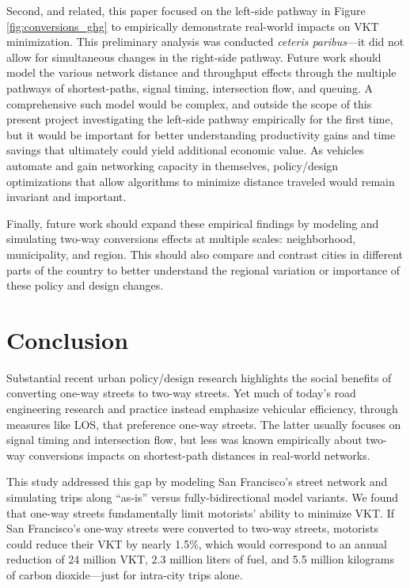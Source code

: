 \documentclass{trbunofficial}
\begin{document}
Second, and related, this paper focused on the left-side pathway in Figure \ref{fig:conversions_ghg} to empirically demonstrate real-world impacts on VKT minimization. This preliminary analysis was conducted \textit{ceteris paribus}---it did not allow for simultaneous changes in the right-side pathway. Future work should model the various network distance and throughput effects through the multiple pathways of shortest-paths, signal timing, intersection flow, and queuing. A comprehensive such model would be complex, and outside the scope of this present project investigating the left-side pathway empirically for the first time, but it would be important for better understanding productivity gains and time savings that ultimately could yield additional economic value. As vehicles automate and gain networking capacity in themselves, policy/design optimizations that allow algorithms to minimize distance traveled would remain invariant and important.

Finally, future work should expand these empirical findings by modeling and simulating two-way conversions effects at multiple scales: neighborhood, municipality, and region. This should also compare and contrast cities in different parts of the country to better understand the regional variation or importance of these policy and design changes.

\section{Conclusion}

Substantial recent urban policy/design research highlights the social benefits of converting one-way streets to two-way streets. Yet much of today's road engineering research and practice instead emphasize vehicular efficiency, through measures like LOS, that preference one-way streets. The latter usually focuses on signal timing and intersection flow, but less was known empirically about two-way conversions impacts on shortest-path distances in real-world networks.

This study addressed this gap by modeling San Francisco's street network and simulating trips along \enquote{as-is} versus fully-bidirectional model variants. We found that one-way streets fundamentally limit motorists' ability to minimize VKT. If San Francisco's one-way streets were converted to two-way streets, motorists could reduce their VKT by nearly 1.5\%, which would correspond to an annual reduction of 24 million VKT, 2.3 million liters of fuel, and 5.5 million kilograms of carbon dioxide---just for intra-city trips alone.
\end{document}
